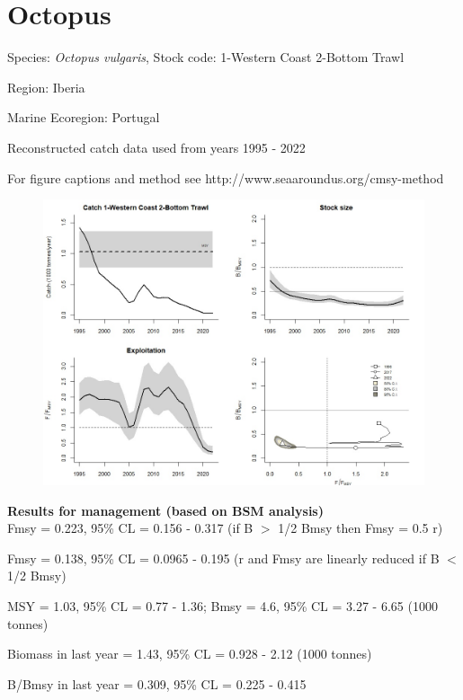 \documentclass[12pt,a4paper]{article}\usepackage[]{graphicx}\usepackage[]{xcolor}
\begin{document}
    \section*{Octopus}


    Species: \emph{Octopus vulgaris}, Stock code: 1-Western Coast 2-Bottom Trawl

Region: Iberia

Marine Ecoregion: Portugal

Reconstructed catch data used from years 1995 - 2022 

 For figure captions and method see http://www.seaaroundus.org/cmsy-method

    \begin{figure}[ht]
    \centering
    \includegraphics[width=1.00\textwidth ext=.jpg type=jpg]{1-Western Coast 2-Bottom Trawl_MAN.jpg}
    \end{figure}

    \textbf{Results for management (based on BSM analysis)}\\

Fmsy = 0.223, 95\% CL = 0.156 - 0.317 (if B $>$ 1/2 Bmsy then Fmsy = 0.5 r)

Fmsy = 0.138, 95\% CL = 0.0965 - 0.195 (r and Fmsy are linearly reduced if B $<$ 1/2 Bmsy)

MSY = 1.03,  95\% CL = 0.77 - 1.36; Bmsy = 4.6,  95\% CL = 3.27 - 6.65 (1000 tonnes)

Biomass in last year = 1.43, 95\% CL = 0.928 - 2.12 (1000 tonnes)

B/Bmsy in last year = 0.309, 95\% CL = 0.225 - 0.415
\end{document}
